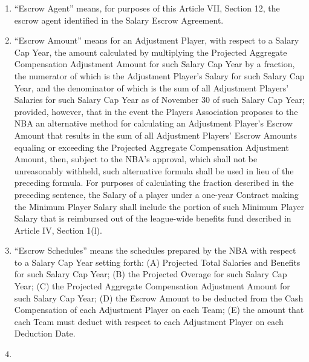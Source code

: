 \documentclass[
]{book}
\begin{document}
\begin{enumerate}
\begin{enumerate}
  \item
    ``Escrow Agent'' means, for purposes of this Article VII, Section 12, the escrow agent identified in the Salary Escrow Agreement.
  \item
    ``Escrow Amount'' means for an Adjustment Player, with respect to a Salary Cap Year, the amount calculated by multiplying the Projected Aggregate Compensation Adjustment Amount for such Salary Cap Year by a fraction, the numerator of which is the Adjustment Player's Salary for such Salary Cap Year, and the denominator of which is the sum of all Adjustment Players' Salaries for such Salary Cap Year as of November 30 of such Salary Cap Year; provided, however, that in the event the Players Association proposes to the NBA an alternative method for calculating an Adjustment Player's Escrow Amount that results in the sum of all Adjustment Players' Escrow Amounts equaling or exceeding the Projected Aggregate Compensation Adjustment Amount, then, subject to the NBA's approval, which shall not be unreasonably withheld, such alternative formula shall be used in lieu of the preceding formula. For purposes of calculating the fraction described in the preceding sentence, the Salary of a player under a one-year Contract making the Minimum Player Salary shall include the portion of such Minimum Player Salary that is reimbursed out of the league-wide benefits fund described in Article IV, Section 1(l).
  \item
    ``Escrow Schedules'' means the schedules prepared by the NBA with respect to a Salary Cap Year setting forth: (A) Projected Total Salaries and Benefits for such Salary Cap Year; (B) the Projected Overage for such Salary Cap Year; (C) the Projected Aggregate Compensation Adjustment Amount for such Salary Cap Year; (D) the Escrow Amount to be deducted from the Cash Compensation of each Adjustment Player on each Team; (E) the amount that each Team must deduct with respect to each Adjustment Player on each Deduction Date.
  \item

\end{enumerate}
\end{enumerate}
\end{document}

